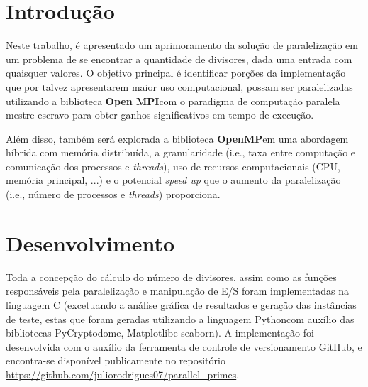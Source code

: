 \documentclass[a4paper, 12pt]{article}
\begin{document}
\tableofcontents
\newpage
\section{Introdução}

Neste trabalho, é apresentado um aprimoramento da solução de paralelização em um problema de se encontrar a quantidade de divisores, dada uma entrada com quaisquer valores. O objetivo principal é identificar porções da implementação que por talvez apresentarem maior uso computacional, possam ser paralelizadas utilizando a biblioteca \textbf{Open MPI}\footnotemark \hspace{0.1cm}com o paradigma de computação paralela mestre-escravo para obter ganhos significativos em tempo de execução.


Além disso, também será explorada a biblioteca \textbf{OpenMP}\footnotemark \hspace{0.1cm}em uma abordagem híbrida com memória distribuída, a granularidade (i.e., taxa entre computação e comunicação dos processos e \emph{threads}), uso de recursos computacionais (CPU, memória principal, ...) e o potencial \emph{speed up} que o aumento da paralelização (i.e., número de processos e \emph{threads}) proporciona.


\section{Desenvolvimento}

Toda a concepção do cálculo do número de divisores, assim como as funções responsáveis pela paralelização e manipulação de E/S foram implementadas na linguagem C (excetuando a análise gráfica de resultados e geração das instâncias de teste, estas que foram geradas utilizando a linguagem Python\footnotemark \hspace{0.1cm}com auxílio das bibliotecas PyCryptodome\footnotemark, Matplotlib\footnotemark \hspace{0.1cm}e seaborn\footnotemark). A implementação foi desenvolvida com o auxílio da ferramenta de controle de versionamento GitHub\footnotemark, e encontra-se disponível publicamente no repositório \url{https://github.com/juliorodrigues07/parallel_primes}.

\end{document}
